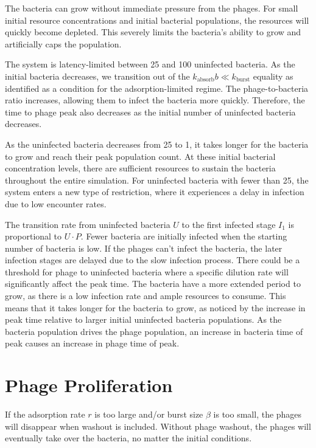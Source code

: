 The bacteria can grow without immediate pressure from the phages. 
For small initial resource concentrations and initial bacterial populations, the resources will quickly become depleted. 
This severely limits the bacteria's ability to grow and artificially caps the population. 

The system is latency-limited between 25 and 100 uninfected bacteria. 
As the initial bacteria decreases, we transition out of the $k_{\text{absorb}}b \ll k_{\text{burst}}$ equality as identified as a condition for the adsorption-limited regime. 
The phage-to-bacteria ratio increases, allowing them to infect the bacteria more quickly. 
Therefore, the time to phage peak also decreases as the initial number of uninfected bacteria decreases. 

As the uninfected bacteria decreases from 25 to 1, it takes longer for the bacteria to grow and reach their peak population count. 
At these initial bacterial concentration levels, there are sufficient resources to sustain the bacteria throughout the entire simulation. 
For uninfected bacteria with fewer than 25, the system enters a new type of restriction, where it experiences a delay in infection due to low encounter rates. 

The transition rate from uninfected bacteria $U$ to the first infected stage $I_1$ is proportional to $U\cdot P$. 
Fewer bacteria are initially infected when the starting number of bacteria is low. 
If the phages can't infect the bacteria, the later infection stages are delayed due to the slow infection process. 
There could be a threshold for phage to uninfected bacteria where a specific dilution rate will significantly affect the peak time. 
The bacteria have a more extended period to grow, as there is a low infection rate and ample resources to consume. 
This means that it takes longer for the bacteria to grow, as noticed by the increase in peak time relative to larger initial uninfected bacteria populations. 
As the bacteria population drives the phage population, an increase in bacteria time of peak causes an increase in phage time of peak. 

\section{Phage Proliferation}
If the adsorption rate $r$ is too large and/or burst size $\beta$ is too small, the phages will disappear when washout is included. 
Without phage washout, the phages will eventually take over the bacteria, no matter the initial conditions. 

